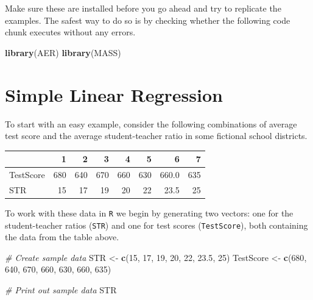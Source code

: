 \documentclass[]{book}
\newenvironment{Shaded}{\begin{snugshade}}{\end{snugshade}}
\newcommand{\KeywordTok}[1]{\textcolor[rgb]{0.13,0.29,0.53}{\textbf{#1}}}
\newcommand{\DecValTok}[1]{\textcolor[rgb]{0.00,0.00,0.81}{#1}}
\newcommand{\FloatTok}[1]{\textcolor[rgb]{0.00,0.00,0.81}{#1}}
\newcommand{\StringTok}[1]{\textcolor[rgb]{0.31,0.60,0.02}{#1}}
\newcommand{\CommentTok}[1]{\textcolor[rgb]{0.56,0.35,0.01}{\textit{#1}}}
\newcommand{\NormalTok}[1]{#1}
\theoremstyle{definition}
\theoremstyle{definition}
\theoremstyle{definition}
\theoremstyle{remark}
\begin{document}
Make sure these are installed before you go ahead and try to replicate
the examples. The safest way to do so is by checking whether the
following code chunk executes without any errors.

\begin{Shaded}
\begin{Highlighting}[]
\KeywordTok{library}\NormalTok{(AER)}
\KeywordTok{library}\NormalTok{(MASS)}
\end{Highlighting}
\end{Shaded}

\section{Simple Linear Regression}\label{simple-linear-regression}

To start with an easy example, consider the following combinations of
average test score and the average student-teacher ratio in some
fictional school districts.

\begin{table}[H]
\centering
\begin{tabular}{lrrrrrrr}
\toprule
  & 1 & 2 & 3 & 4 & 5 & 6 & 7\\
\midrule
TestScore & 680 & 640 & 670 & 660 & 630 & 660.0 & 635\\
STR & 15 & 17 & 19 & 20 & 22 & 23.5 & 25\\
\bottomrule
\end{tabular}
\end{table}

To work with these data in \texttt{R} we begin by generating two
vectors: one for the student-teacher ratios (\texttt{STR}) and one for
test scores (\texttt{TestScore}), both containing the data from the
table above.

\begin{Shaded}
\begin{Highlighting}[]
\CommentTok{# Create sample data}
\NormalTok{STR <-}\StringTok{ }\KeywordTok{c}\NormalTok{(}\DecValTok{15}\NormalTok{, }\DecValTok{17}\NormalTok{, }\DecValTok{19}\NormalTok{, }\DecValTok{20}\NormalTok{, }\DecValTok{22}\NormalTok{, }\FloatTok{23.5}\NormalTok{, }\DecValTok{25}\NormalTok{)}
\NormalTok{TestScore <-}\StringTok{ }\KeywordTok{c}\NormalTok{(}\DecValTok{680}\NormalTok{, }\DecValTok{640}\NormalTok{, }\DecValTok{670}\NormalTok{, }\DecValTok{660}\NormalTok{, }\DecValTok{630}\NormalTok{, }\DecValTok{660}\NormalTok{, }\DecValTok{635}\NormalTok{) }

\CommentTok{# Print out sample data}
\NormalTok{STR}
\end{Highlighting}
\end{Shaded}
\end{document}
